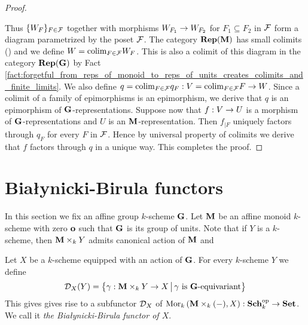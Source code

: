 \begin{proof}
\begin{center}
\end{center}
Thus $\{W_F\}_{F\in {\mathcal F}}$ together with morphisms $W_{F_1}\rightarrow W_{F_2}$ for $F_1\subseteq F_2$ in ${\mathcal F}$ form a diagram parametrized by the poset ${\mathcal F}$. The category $\mathbf{Rep}(\mathbf{M})$ has small colimits ({\cite[Corollary 14.5]{Monoid_k_functors}}) and we define $W = \mathrm{colim}_{F\in {\mathcal F}}W_F$. This is also a colimit of this diagram in the category $\mathbf{Rep}(\mathbf{G})$ by Fact \ref{fact:forgetful_from_reps_of_monoid_to_reps_of_units_creates_colimits_and_finite_limits}. We also define $q = \mathrm{colim}_{F\in {\mathcal F}}q_F:V = \mathrm{colim}_{F\in {\mathcal F}}F \rightarrow W$.  Since a colimit of a family of epimorphisms is an epimorphism, we derive that $q$ is an epimorphism of $\mathbf{G}$-representations. Suppose now that $f:V\rightarrow U$ is a morphism of $\mathbf{G}$-representations and $U$ is an $\mathbf{M}$-representation. Then $f_{\mid F}$ uniquely factors through $q_F$ for every $F$ in ${\mathcal F}$. Hence by universal property of colimits we derive that $f$ factors through $q$ in a unique way. This completes the proof.
\end{proof}

\section{Bia{\l}ynicki-Birula functors}
\noindent
In this section we fix an affine group $k$-scheme $\mathbf{G}$. Let $\mathbf{M}$ be an affine monoid $k$-scheme with zero $\mathbf{o}$ such that $\mathbf{G}$ is its group of units. Note that if $Y$ is a $k$-scheme, then $\mathbf{M}\times_kY$ admits canonical action of $\mathbf{M}$ and 

\begin{definition}
Let $X$ be a $k$-scheme equipped with an action of $\mathbf{G}$. For every $k$-scheme $Y$ we define
$${\mathcal D}_X(Y) = \big\{\gamma:\mathbf{M}\times_kY\rightarrow X\,\big|\,\gamma\mbox{ is }\mathbf{G}\mbox{-equivariant}\big\}$$
This gives gives rise to a subfunctor ${\mathcal D}_X$ of $\mathrm{Mor}_{k}\left(\mathbf{M}\times_k(-),X\right):\mathbf{Sch}_k^{\mathrm{op}}\rightarrow \mathbf{Set}$. We call it \textit{the Bia{\l}ynicki-Birula functor of $X$}.
\end{definition}

